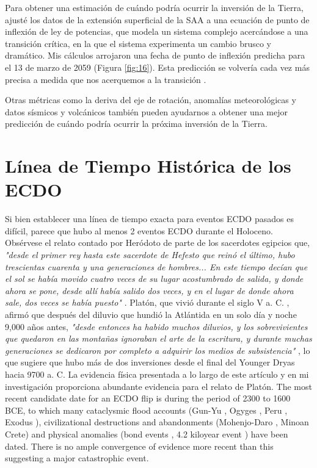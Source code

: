 \documentclass[10pt,twocolumn,letterpaper]{article}
\begin{document}
Para obtener una estimación de cuándo podría ocurrir la inversión de la Tierra, ajusté los datos de la extensión superficial de la SAA a una ecuación de punto de inflexión de ley de potencias, que modela un sistema complejo acercándose a una transición crítica, en la que el sistema experimenta un cambio brusco y dramático. Mis cálculos arrojaron una fecha de punto de inflexión predicha para el 13 de marzo de 2059 (Figura \ref{fig:16}). Esta predicción se volvería cada vez más precisa a medida que nos acerquemos a la transición \cite{136}.

Otras métricas como la deriva del eje de rotación, anomalías meteorológicas y datos sísmicos y volcánicos también pueden ayudarnos a obtener una mejor predicción de cuándo podría ocurrir la próxima inversión de la Tierra.

\section{Línea de Tiempo Histórica de los ECDO}

Si bien establecer una línea de tiempo exacta para eventos ECDO pasados es difícil, parece que hubo al menos 2 eventos ECDO durante el Holoceno. Obsérvese el relato contado por Heródoto de parte de los sacerdotes egipcios que, \textit{"desde el primer rey hasta este sacerdote de Hefesto que reinó el último, hubo trescientas cuarenta y una generaciones de hombres... En este tiempo decían que el sol se había movido cuatro veces de su lugar acostumbrado de salida, y donde ahora se pone, desde allí había salido dos veces, y en el lugar de donde ahora sale, dos veces se había puesto"} \cite{32}. Platón, que vivió durante el siglo V a. C. \cite{111}, afirmó que después del diluvio que hundió la Atlántida en un solo día y noche 9,000 años antes, \textit{"desde entonces ha habido muchos diluvios, y los sobrevivientes que quedaron en las montañas ignoraban el arte de la escritura, y durante muchas generaciones se dedicaron por completo a adquirir los medios de subsistencia"} \cite{112}, lo que sugiere que hubo más de dos inversiones desde el final del Younger Dryas hacia 9700 a. C. La evidencia física presentada a lo largo de este artículo y en mi investigación \cite{2} proporciona abundante evidencia para el relato de Platón.
The most recent candidate date for an ECDO flip is during the period of 2300 to 1600 BCE, to which many cataclysmic flood accounts (Gun-Yu \cite{113,114,115}, Ogyges \cite{116,117}, Peru \cite{118,119}, Exodus \cite{120}), civilizational destructions and abandonments (Mohenjo-Daro \cite{121}, Minoan Crete\cite{100,101}) and physical anomalies (bond events \cite{122}, 4.2 kiloyear event \cite{90}) have been dated. There is no ample convergence of evidence more recent than this suggesting a major catastrophic event.
\end{document}
